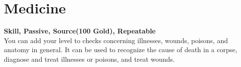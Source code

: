 \section{Medicine}\label{sec:medicine}
\textbf{Skill, Passive, Source(100 Gold), Repeatable}\\
You can add your level to checks concerning illnesses, wounds, poisons, and anatomy in general. It can be used to recognize the cause of death in a corpse, diagnose and treat illnesses or poisons, and treat wounds.